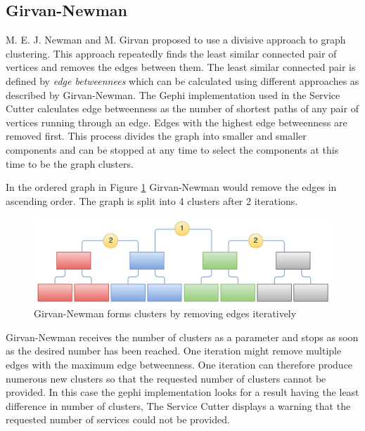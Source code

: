 \subsection{Girvan-Newman}
\label{subsec:girvanNewman}
	

M. E. J. Newman and M. Girvan\cite{girvan} proposed to use a divisive approach to graph clustering. This approach repeatedly finds the least similar connected pair of vertices and removes the edges between them. The least similar connected pair is defined by \textit{edge betweennees} which can be calculated using different approaches as described by Girvan-Newman. The Gephi implementation used in the Service Cutter calculates edge betweenness as the number of shortest paths of any pair of vertices running through an edge. Edges with the highest edge betweenness are removed first. This process divides the graph into smaller and smaller components and can be stopped at any time to select the components at this time to be the graph clusters.

In the ordered graph in Figure \ref{fig:girvan-newman-process} Girvan-Newman would remove the edges in ascending order. The graph is split into 4 clusters after 2 iterations.

\begin{figure}[H]
	\begin{center}
		\includegraphics[scale=0.45]{diagrams/Girvan-Newman-Process.pdf}
	\end{center}
	\caption{Girvan-Newman forms clusters by removing edges iteratively}
	\label{fig:girvan-newman-process}
\end{figure}

Girvan-Newman receives the number of clusters as a parameter and stops as soon as the desired number has been reached. One iteration might remove multiple edges with the maximum edge betweenness. One iteration can therefore produce numerous new clusters so that the requested number of clusters cannot be provided. In this case the gephi implementation looks for a result having the least difference in number of clusters, The Service Cutter displays a warning that the requested number of services could not be provided.

